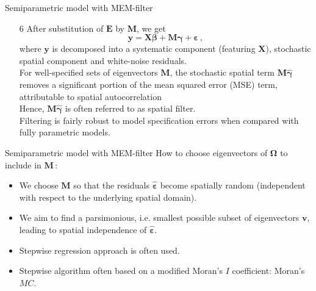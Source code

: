 \documentclass{beamer}
\begin{document}
\begin{frame}{Semiparametric model with MEM-filter}
\begin{itemize}
    \item[6] After substitution of $\bm{E}$ by $\bm{M}$, we get
\begin{equation*}
\bm{y} = \bm{X \beta } + \bm{M \gamma} + \bm{\varepsilon} \, ,
\end{equation*}
where $\bm{y}$ is decomposed into a systematic component (featuring $\bm{X}$), stochastic spatial component and white-noise residuals. 
\\ \medskip 
For well-specified sets of eigenvectors $\bm{M}$, the stochastic spatial term $\bm{M \hat{\gamma}}$ removes a significant portion of the mean squared error (MSE) term, attributable to spatial autocorrelation 
\\ \medskip 
Hence, $\bm{M \hat{\gamma}}$ is often referred to as spatial filter. 
\\ \medskip 
Filtering is fairly robust to model specification errors when compared with fully parametric models.
\end{itemize}
\end{frame}
\begin{frame}{Semiparametric model with MEM-filter}
How to choose eigenvectors of $\bm{\Omega}$ to include in $\bm{M}\,$:
\medskip
\begin{itemize}
    \item We choose $\bm{M}$ so that the residuals $\bm{\hat{\varepsilon}}$ become spatially random (independent with respect to the underlying spatial domain). 
    \smallskip
    \item We aim to find a parsimonious, i.e. smallest possible subset of eigenvectors $\bm{v}$, leading to spatial independence of $\bm{\hat{\varepsilon}}$.
    \smallskip
    \item Stepwise regression approach is often used.
    \smallskip
    \item Stepwise algorithm often based on a modified Moran's $I$ coefficient: Moran's $\textit{MC}$.
\end{itemize}
\end{frame}
\end{document}
